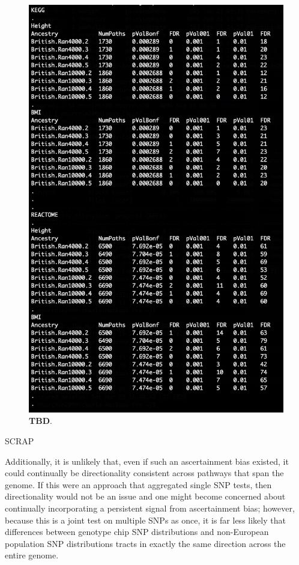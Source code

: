 \documentclass[12pt, a4paper]{article}
\begin{document}
\begin{figure}[htbp]
\centering
\includegraphics[scale=1.5]{Images/Supp/InterPath_Supp_Figure_FDRs_BritReps_vs1.png}
\caption[TBD]{\textbf{TBD}. }
\label{InterPath-Supp-Figure-BritReps-FDRs}
\end{figure}
\clearpage


\begingroup


\endgroup


\iffalse

SCRAP

Additionally, it is unlikely that, even if such an ascertainment bias existed, it could continually be directionality consistent across pathways that span the genome. If this were an approach that aggregated single SNP tests, then directionality would not be an issue and one might become concerned about continually incorporating a persistent signal from ascertainment bias; however, because this is a joint test on multiple SNPs as once, it is far less likely that differences between genotype chip SNP distributions and non-European population SNP distributions tracts in exactly the same direction across the entire genome.
\end{document}
